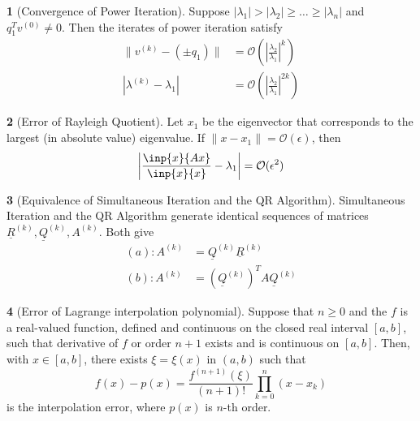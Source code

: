 \documentclass[12pt]{article}
\theoremstyle{definition}
\newtheorem{theorem}{\color{ForestGreen}{\textbf{Theorem}}}
\newcommand{\e}{\epsilon}
\newcommand{\norm}[1]{\lVert#1\rVert}
\begin{document}
\begin{theorem}[Convergence of Power Iteration]
Suppose $|\lambda_1|  > |\lambda_2| \geq \ldots \geq |\lambda_n|$ and $q_1^T v^{(0)} \neq 0$. Then the iterates of power iteration satisfy
\begin{align}
\norm{v^{(k)} - (\pm q_1)} &= \mathcal{O}\left( \left\vert \frac{\lambda_2}{\lambda_1} \right\vert^k \right) \tag{error of eigenvector} \\
|\lambda^{(k)} - \lambda_1 | &= \mathcal{O}\left( \left\vert \frac{\lambda_2}{\lambda_1} \right\vert^{2k} \right) \tag{error of eigenvalue}
\end{align}
\end{theorem}

\begin{theorem}[Error of Rayleigh Quotient]
Let $x_1$ be the eigenvector that corresponds to the largest (in absolute value) eigenvalue. If $\norm{x - x_1} = \mathcal{O}(\e)$, then
\begin{equation}
\left\vert \frac{\inp{x}{Ax}}{\inp{x}{x}}  - \lambda_1 \right\vert = \mathcal{O}(\e^2)
\end{equation}
\end{theorem}

\begin{theorem}[Equivalence of Simultaneous Iteration and the QR Algorithm]
Simultaneous Iteration and the QR Algorithm generate identical sequences of matrices $\underline R^{(k)}, \underline Q^{(k)}, A^{(k)}$. Both give
\begin{align}
(a): A^{(k)} &= \underline Q^{(k)} \underline R^{(k)} \tag{$QR$ factorization of the $k$th power of $A$}\\
(b): A^{(k)} &= (\underline Q^{(k)})^T A \underline Q^{(k)} \tag{projection}
\end{align}
\end{theorem}

\begin{theorem}[Error of Lagrange interpolation polynomial]
Suppose that $n\geq 0$ and the $f$ is a real-valued function, defined and continuous on the closed real interval $[a,b]$, such that derivative of $f$ or order $n+1$ exists and is continuous on $[a,b]$. Then, with $x \in [a,b]$, there exists $\xi = \xi(x)$ in $(a,b)$ such that
\begin{equation}
f(x) - p(x) = \frac{f^{(n+1)}(\xi)}{(n+1)!} \prod_{k=0}^n (x-x_k)
\end{equation}
is the interpolation error, where $p(x)$ is $n$-th order.
\end{theorem}
\end{document}
